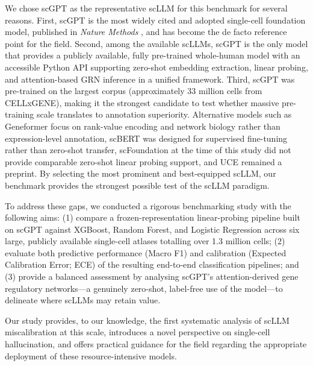 \documentclass[11pt,a4paper]{article}
\makeatletter
\renewcommand\section{\@startsection{section}{1}{\z@}{-3.5ex plus -1ex minus -.2ex}{2.3ex plus .2ex}{\normalfont\large\bfseries}}
\makeatother
\begin{document}
We chose scGPT as the representative scLLM for this benchmark for several reasons. First, scGPT is the most widely cited and adopted single-cell foundation model, published in \textit{Nature Methods} \citep{Cui2024}, and has become the de facto reference point for the field. Second, among the available scLLMs, scGPT is the only model that provides a publicly available, fully pre-trained whole-human model with an accessible Python API supporting zero-shot embedding extraction, linear probing, and attention-based GRN inference in a unified framework. Third, scGPT was pre-trained on the largest corpus (approximately 33 million cells from CELLxGENE), making it the strongest candidate to test whether massive pre-training scale translates to annotation superiority. Alternative models such as Geneformer \citep{Theodoris2023} focus on rank-value encoding and network biology rather than expression-level annotation, scBERT \citep{Yang2022} was designed for supervised fine-tuning rather than zero-shot transfer, scFoundation \citep{Hao2024} at the time of this study did not provide comparable zero-shot linear probing support, and UCE \citep{Rosen2023} remained a preprint. By selecting the most prominent and best-equipped scLLM, our benchmark provides the strongest possible test of the scLLM paradigm.

To address these gaps, we conducted a rigorous benchmarking study with the following aims: (1) compare a frozen-representation linear-probing pipeline built on scGPT against XGBoost, Random Forest, and Logistic Regression across six large, publicly available single-cell atlases totalling over 1.3 million cells; (2) evaluate both predictive performance (Macro F1) and calibration (Expected Calibration Error; ECE) of the resulting end-to-end classification pipelines; and (3) provide a balanced assessment by analysing scGPT's attention-derived gene regulatory networks---a genuinely zero-shot, label-free use of the model---to delineate where scLLMs may retain value.

Our study provides, to our knowledge, the first systematic analysis of scLLM miscalibration at this scale, introduces a novel perspective on single-cell hallucination, and offers practical guidance for the field regarding the appropriate deployment of these resource-intensive models.

\section{Methods}
\end{document}
